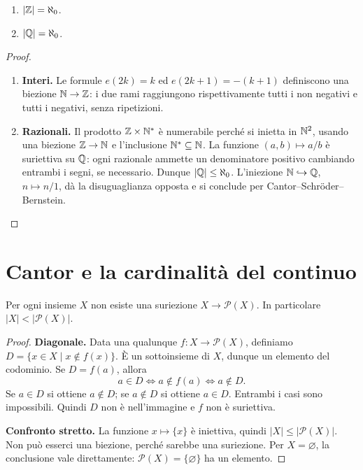 \begin{corollario}
\begin{enumerate}[label=\arabic*.]
\item $|\mathbb{Z}|=\aleph_0$.
\item $|\mathbb{Q}|=\aleph_0$.
\end{enumerate}
\end{corollario}
\begin{proof}
\begin{enumerate}[label=\arabic*.]
\item \textbf{Interi.} Le formule $e(2k)=k$ ed $e(2k+1)=-(k+1)$ definiscono una biezione $\mathbb{N}\to\mathbb{Z}$: i due rami raggiungono rispettivamente tutti i non negativi e tutti i negativi, senza ripetizioni.
\item \textbf{Razionali.} Il prodotto $\mathbb{Z}\times\mathbb{N}^*$ è numerabile perché si inietta in $\mathbb{N}^2$, usando una biezione $\mathbb{Z}\to\mathbb{N}$ e l'inclusione $\mathbb{N}^*\subseteq\mathbb{N}$. La funzione $(a,b)\mapsto a/b$ è suriettiva su $\mathbb{Q}$: ogni razionale ammette un denominatore positivo cambiando entrambi i segni, se necessario. Dunque $|\mathbb{Q}|\le\aleph_0$. L'iniezione $\mathbb{N}\hookrightarrow\mathbb{Q}$, $n\mapsto n/1$, dà la disuguaglianza opposta e si conclude per Cantor--Schröder--Bernstein.
\end{enumerate}
\end{proof}

\section{Cantor e la cardinalità del continuo}
\begin{teorema}[Cantor]\label{teo:cantor}
Per ogni insieme $X$ non esiste una suriezione $X\to\mathcal P(X)$. In particolare $|X|<|\mathcal P(X)|$.
\end{teorema}
\begin{proof}
\textbf{Diagonale.} Data una qualunque $f:X\to\mathcal P(X)$, definiamo $D=\{x\in X\mid x\notin f(x)\}$. È un sottoinsieme di $X$, dunque un elemento del codominio. Se $D=f(a)$, allora
\[
a\in D\iff a\notin f(a)\iff a\notin D.
\]
Se $a\in D$ si ottiene $a\notin D$; se $a\notin D$ si ottiene $a\in D$. Entrambi i casi sono impossibili. Quindi $D$ non è nell'immagine e $f$ non è suriettiva.

\textbf{Confronto stretto.} La funzione $x\mapsto\{x\}$ è iniettiva, quindi $|X|\le|\mathcal P(X)|$. Non può esserci una biezione, perché sarebbe una suriezione. Per $X=\varnothing$, la conclusione vale direttamente: $\mathcal P(X)=\{\varnothing\}$ ha un elemento.
\end{proof}


